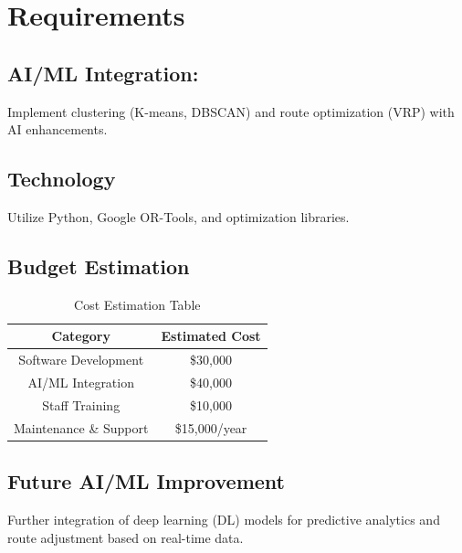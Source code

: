 \documentclass[a4paper,12pt, final]{article}
\begin{document}
\newpage


\section{Requirements}
\subsection{AI/ML Integration:}
Implement clustering (K-means, DBSCAN) and route optimization (VRP) with AI enhancements.

\subsection{Technology}
Utilize Python, Google OR-Tools, and optimization libraries.
\subsection{Budget Estimation}
        \begin{table}[h]
            \centering
            \begin{tabular}{|c|c|}
                \hline
                \textbf{Category}        & \textbf{Estimated Cost} \\ \hline
                Software Development     & \$30,000              \\ \hline
                AI/ML Integration        & \$40,000              \\ \hline
                Staff Training           & \$10,000              \\ \hline
                Maintenance \& Support   & \$15,000/year         \\ \hline
            \end{tabular}
            \caption{Cost Estimation Table}
        \end{table}

\subsection{Future AI/ML Improvement} 
Further integration of deep learning (DL) models for predictive analytics and route adjustment based on real-time data.
\end{document}
